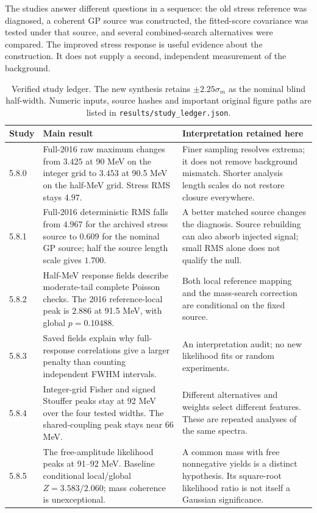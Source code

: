 The studies answer different questions in a sequence: the old stress reference was diagnosed, a coherent GP source was constructed, the fitted-score covariance was tested under that source, and several combined-search alternatives were compared. The improved stress response is useful evidence about the construction. It does not supply a second, independent measurement of the background.

\begin{table}[htbp]\centering\small
\begin{tabular}{p{.10\linewidth}p{.41\linewidth}p{.40\linewidth}}\toprule
Study & Main result & Interpretation retained here\\\midrule
5.8.0 & Full-2016 raw maximum changes from $3.425$ at 90 MeV on the integer grid to $3.453$ at 90.5 MeV on the half-MeV grid. Stress RMS stays $4.97$. & Finer sampling resolves extrema; it does not remove background mismatch. Shorter analysis length scales do not restore closure everywhere.\\
5.8.1 & Full-2016 deterministic RMS falls from $4.967$ for the archived stress source to $0.609$ for the nominal GP source; half the source length scale gives $1.700$. & A better matched source changes the diagnosis. Source rebuilding can also absorb injected signal; small RMS alone does not qualify the null.\\
5.8.2 & Half-MeV response fields describe moderate-tail complete Poisson checks. The 2016 reference-local peak is $2.886$ at 91.5 MeV, with global $p=0.10488$. & Both local reference mapping and the mass-search correction are conditional on the fixed source.\\
5.8.3 & Saved fields explain why full-response correlations give a larger penalty than counting independent FWHM intervals. & An interpretation audit; no new likelihood fits or random experiments.\\
5.8.4 & Integer-grid Fisher and signed Stouffer peaks stay at 92 MeV over the four tested widths. The shared-coupling peak stays near 66 MeV. & Different alternatives and weights select different features. These are repeated analyses of the same spectra.\\
5.8.5 & The free-amplitude likelihood peaks at 91--92 MeV. Baseline conditional local/global $Z=3.583/2.060$; mass coherence is unexceptional. & A common mass with free nonnegative yields is a distinct hypothesis. Its square-root likelihood ratio is not itself a Gaussian significance.\\\bottomrule
\end{tabular}
\caption{Verified study ledger. The new synthesis retains $\pm2.25\sigma_m$ as the nominal blind half-width. Numeric inputs, source hashes and important original figure paths are listed in \texttt{results/study\_ledger.json}.}
\end{table}

